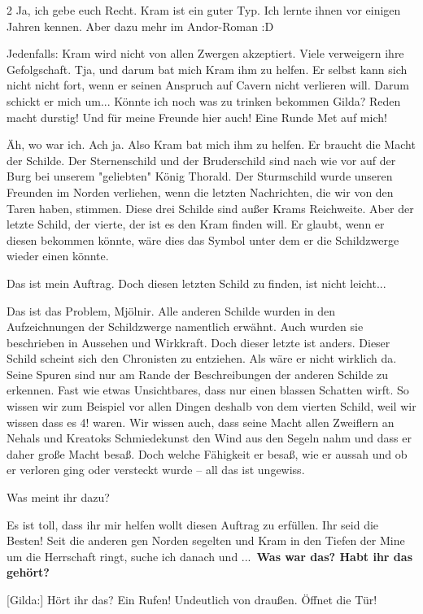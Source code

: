\documentclass[10pt, a4paper, oneside]{book}
\begin{document}
\begin{multicols}{2}
Ja, ich gebe euch Recht. Kram ist ein guter Typ. Ich lernte ihnen vor einigen Jahren kennen. Aber dazu mehr im Andor-Roman :D

Jedenfalls: Kram wird nicht von allen Zwergen akzeptiert. Viele verweigern ihre Gefolgschaft. Tja, und darum bat mich Kram ihm zu helfen. Er selbst kann sich nicht nicht fort, wenn er seinen Anspruch auf Cavern nicht verlieren will. Darum schickt er mich um... Könnte ich noch was zu trinken bekommen Gilda? Reden macht durstig! Und für meine Freunde hier auch! Eine Runde Met auf mich!

Äh, wo war ich. Ach ja. Also Kram bat mich ihm zu helfen. Er braucht die Macht der Schilde. Der Sternenschild und der Bruderschild sind nach wie vor auf der Burg bei unserem "geliebten" König Thorald. Der Sturmschild wurde unseren Freunden im Norden verliehen, wenn die letzten Nachrichten, die wir von den Taren haben, stimmen. Diese drei Schilde sind außer Krams Reichweite. Aber der letzte Schild, der vierte, der ist es den Kram finden will. Er glaubt, wenn er diesen bekommen könnte, wäre dies das Symbol unter dem er die Schildzwerge wieder einen könnte.

Das ist mein Auftrag. Doch diesen letzten Schild zu finden, ist nicht leicht...

Das ist das Problem, Mjölnir. Alle anderen Schilde wurden in den Aufzeichnungen der Schildzwerge namentlich erwähnt. Auch wurden sie beschrieben in Aussehen und Wirkkraft. Doch dieser letzte ist anders. Dieser Schild scheint sich den Chronisten zu entziehen. Als wäre er nicht wirklich da. Seine Spuren sind nur am Rande der Beschreibungen der anderen Schilde zu erkennen. Fast wie etwas Unsichtbares, dass nur einen blassen Schatten wirft. So wissen wir zum Beispiel vor allen Dingen deshalb von dem vierten Schild, weil wir wissen dass es 4! waren. Wir wissen auch, dass seine Macht allen Zweiflern an Nehals und Kreatoks Schmiedekunst den Wind aus den Segeln nahm und dass er daher große Macht besaß. Doch welche Fähigkeit er besaß, wie er aussah und ob er verloren ging oder versteckt wurde – all das ist ungewiss.

Was meint ihr dazu?

Es ist toll, dass ihr mir helfen wollt diesen Auftrag zu erfüllen. Ihr seid die Besten!
Seit die anderen gen Norden segelten und Kram in den Tiefen der Mine um die Herrschaft ringt, suche ich danach und ... \textbf{Was war das? Habt ihr das gehört?}

[Gilda:] Hört ihr das? Ein Rufen! Undeutlich von draußen. Öffnet die Tür!


\end{multicols}
\end{document}
